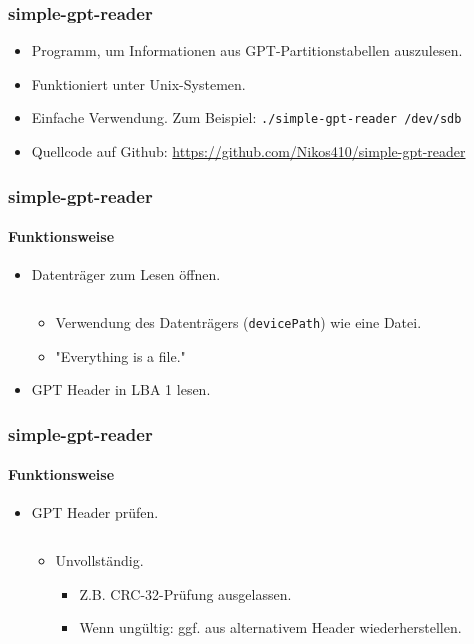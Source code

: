 \begin{frame}
    \frametitle{simple-gpt-reader}
    
    \begin{itemize}
        \item Programm, um Informationen aus GPT-Partitionstabellen auszulesen.
        \item Funktioniert unter Unix-Systemen.
        \item Einfache Verwendung. Zum Beispiel: \texttt{./simple-gpt-reader /dev/sdb}
        \item Quellcode auf Github: \url{https://github.com/Nikos410/simple-gpt-reader}
    \end{itemize}
\end{frame}

\begin{frame}
    \frametitle{simple-gpt-reader}
    \framesubtitle{Funktionsweise}
    
    \begin{itemize}
        \item Datenträger zum Lesen öffnen.
        \inputminted[firstline=8, lastline=8, breaklines, frame=single]{c++}{content/code/simple-gpt-reader/LbaHelper.cpp}

        \pause
        \begin{itemize}
            \item Verwendung des Datenträgers (\texttt{devicePath}) wie eine Datei.
            \item "Everything is a file."
        \end{itemize}

        \pause
        \item GPT Header in LBA 1 lesen.
    \end{itemize}
\end{frame}

\begin{frame}
    \frametitle{simple-gpt-reader}
    \framesubtitle{Funktionsweise}
    
    \begin{itemize}
        \item GPT Header prüfen.
        \inputminted[firstline=3, lastline=8, breaklines, frame=single]{c++}{content/code/simple-gpt-reader/GptHeader.cpp}

        \pause
        \begin{itemize}
            \item Unvollständig.
            \begin{itemize}
                \item Z.B. CRC-32-Prüfung ausgelassen.
                \item Wenn ungültig: ggf. aus alternativem Header wiederherstellen.
            \end{itemize}
        \end{itemize}
    \end{itemize}
\end{frame}

